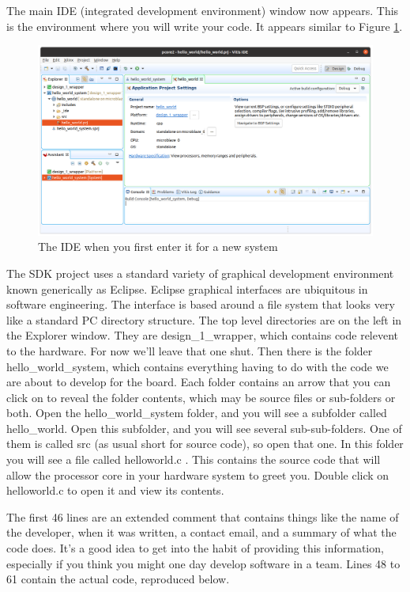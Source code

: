 \documentclass[../physical_computing.tex]{subfiles}
\begin{document}
The main IDE (integrated development environment) window now appears. This is the environment where you will write your code. It appears similar to Figure \ref{fig:firstide}.

\begin{figure}[h!]
    \centering
    \includegraphics[width=\textwidth]{appendix_8/figures/firstide.png}
    \caption{The IDE when you first enter it for a new system}
    \label{fig:firstide}
\end{figure}

The SDK project uses a standard variety of graphical development
environment known generically as Eclipse. Eclipse graphical interfaces
are ubiquitous in software engineering. The interface is based 
around a file system that looks very like a standard PC directory 
structure. The top level directories are on the left in the Explorer
window. They are design\_1\_wrapper, which contains code relevent to 
the hardware. For now we'll leave that one shut. Then there is the 
folder hello\_world\_system, which contains everything having to do with the
code we are about to develop for the board. Each folder contains an
arrow that you can click on to reveal the folder contents, which may
be source files or sub-folders or both. Open the hello\_world\_system
folder, and you will see a subfolder called hello\_world. Open this
subfolder, and you will see several sub-sub-folders. One of them is
called src (as usual short for source code), so open that one. In
this folder you will see a file called helloworld.c . This contains the
source code that will allow the processor core in your hardware system
to greet you. Double click on helloworld.c to open it and view its 
contents.

The first 46 lines are an extended comment that contains things like
the name of the developer, when it was written, a contact email, and
a summary of what the code does. It's a good idea to get into the habit
of providing this information, especially if you think you might one
day develop software in a team. Lines 48 to 61 contain the actual code,
reproduced below.
\end{document}
